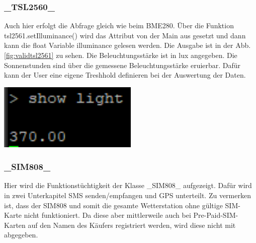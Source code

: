 \subsubsection{\_TSL2560\_}
\label{subsubsec:valTSL2560}
\begin{minipage}[b][6.5cm][t]{0.48\textwidth}
Auch hier erfolgt die Abfrage gleich wie beim BME280. Über die Funktion tsl2561.setIlluminance() wird das Attribut von der Main aus gesetzt und dann kann die float Variable illuminance gelesen werden. Die Ausgabe ist in der Abb. \ref{fig:validtsl2561} zu sehen. Die Beleuchtungsstärke ist in lux angegeben. Die Sonnenstunden sind über die gemessene Beleuchtungsstärke eruierbar. Dafür kann der User eine eigene Treshhold definieren bei der Auswertung der Daten.\\
\end{minipage}
\begin{minipage}[b][6.5cm][t]{0.4\textwidth}
\centering
\includegraphics[width=0.5\textwidth]{../../graphics/FW_val/tsl2561.PNG} 
\label{fig:validtsl2561}
\end{minipage}

\subsubsection{\_SIM808\_}
\label{subsubsec:valSIM808}
Hier wird die Funktionstüchtigkeit der Klasse \_SIM808\_ aufgezeigt. Dafür wird in zwei Unterkapitel SMS senden/empfangen und GPS unterteilt. Zu vermerken ist, dass der SIM808 und somit die gesamte Wetterstation ohne gültige SIM-Karte nicht funktioniert. Da diese aber mittlerweile auch bei Pre-Paid-SIM-Karten auf den Namen des Käufers registriert werden, wird diese nicht mit abgegeben.\\

